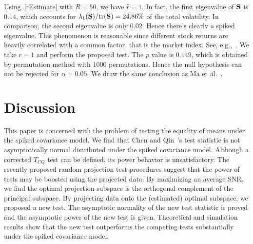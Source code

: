 \documentclass[times,sort&compress,3p]{elsarticle}
\newcommand{\mytr}{ {\rm tr} }
\theoremstyle{plain}
\theoremstyle{definition}
\theoremstyle{remark}
\begin{document}
Using~\eqref{rEstimate} with $R=50$, we have $\hat{r}=1$.
In fact, the first eigenvalue of $\mathbf{S}$ is $0.14$, which accounts for $\lambda_1(\BS)/\mytr(\BS)=24.86\%$ of the total volatility.
In comparison, the second eigenvalue is only $0.02$.
Hence there's clearly a spiked eigenvalue.
This phenomenon is reasonable since different stock returns are heavily correlated with a common factor, that is the market index. See, e.g.,~\cite{Ma2015A}.
We take $r=1$ and perform the proposed test.
The $p$ value is $0.149$, which is obtained by permutation method with $1000$ permutations.
Hence the null hypothesis can not be rejected for $\alpha=0.05$.
We draw the same conclusion as Ma {\rm et al.}~\cite{Ma2015A}.



\section{Discussion}



This paper is concerned with the problem of testing the equality of means under the spiked covariance model.
We find that Chen and Qin~\cite{Chen2010A}'s test statistic is not asymptotically normal distributed under the spiked covariance model. 
Although a corrected $T_{CQ}$ test can be defined, its power behavior is unsatisfactory.
The recently proposed random projection test procedures suggest that the power of tests may be boosted using the projected data.
By maximizing an average SNR, we find the optimal projection subspace is the orthogonal complement of the principal subspace.
By projecting data onto the (estimated) optimal subspace, we proposed a new test.
The asymptotic normality of the new test statistic is proved and the asymptotic power of the new test is given.
    Theoretical and simulation results show that the new test outperforms the competing tests substantially under the spiked covariance model.
\end{document}
